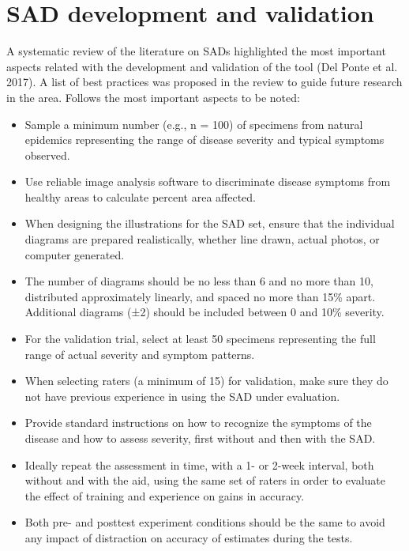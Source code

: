 \documentclass[
  letterpaper,
  DIV=11,
  numbers=noendperiod]{scrreprt}
\begin{document}
\hypertarget{sad-development-and-validation}{%
\section{SAD development and
validation}\label{sad-development-and-validation}}

A systematic review of the literature on SADs highlighted the most
important aspects related with the development and validation of the
tool (Del Ponte et al. 2017). A list of best practices was proposed in
the review to guide future research in the area. Follows the most
important aspects to be noted:

\begin{tcolorbox}[enhanced jigsaw, bottomtitle=1mm, colbacktitle=quarto-callout-tip-color!10!white, breakable, left=2mm, leftrule=.75mm, rightrule=.15mm, toprule=.15mm, colframe=quarto-callout-tip-color-frame, arc=.35mm, toptitle=1mm, opacityback=0, coltitle=black, title=\textcolor{quarto-callout-tip-color}{\faLightbulb}\hspace{0.5em}{Best practices on SADs development}, colback=white, titlerule=0mm, bottomrule=.15mm, opacitybacktitle=0.6]

\begin{itemize}
\item
  Sample a minimum number (e.g., n = 100) of specimens from natural
  epidemics representing the range of disease severity and typical
  symptoms observed.
\item
  Use reliable image analysis software to discriminate disease symptoms
  from healthy areas to calculate percent area affected.
\item
  When designing the illustrations for the SAD set, ensure that the
  individual diagrams are prepared realistically, whether line drawn,
  actual photos, or computer generated.
\item
  The number of diagrams should be no less than 6 and no more than 10,
  distributed approximately linearly, and spaced no more than 15\%
  apart. Additional diagrams (±2) should be included between 0 and 10\%
  severity.
\item
  For the validation trial, select at least 50 specimens representing
  the full range of actual severity and symptom patterns.
\item
  When selecting raters (a minimum of 15) for validation, make sure they
  do not have previous experience in using the SAD under evaluation.
\item
  Provide standard instructions on how to recognize the symptoms of the
  disease and how to assess severity, first without and then with the
  SAD.
\item
  Ideally repeat the assessment in time, with a 1- or 2-week interval,
  both without and with the aid, using the same set of raters in order
  to evaluate the effect of training and experience on gains in
  accuracy.
\item
  Both pre- and posttest experiment conditions should be the same to
  avoid any impact of distraction on accuracy of estimates during the
  tests.
\end{itemize}

\end{tcolorbox}
\end{document}
